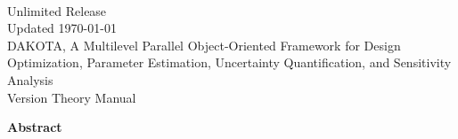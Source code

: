 \documentclass[letterpaper]{book}
\begin{document}
\begin{titlepage}
\setcounter{page}{3}
\begin{center}
{\large \DakotaSANDTheory}\\
{\large Unlimited Release}\\
{\large Updated \today}\\

\vspace*{1.5cm}
{\LARGE DAKOTA, A Multilevel Parallel Object-Oriented Framework for 
Design Optimization, Parameter Estimation, Uncertainty Quantification, 
and Sensitivity Analysis}\\
\vspace*{1cm}
{\LARGE Version \DakotaVersion\space Theory Manual}\\
\vspace*{1cm}

\DakotaAuthorFormatted
\vspace*{1cm}

\newpage

{\Large \bf Abstract}
\end{center}

\DakotaAbstractShared
\DakotaAbstractTheory

\end{titlepage}

\cleardoublepage
\tableofcontents
\cleardoublepage

%
%





%



\end{document}
